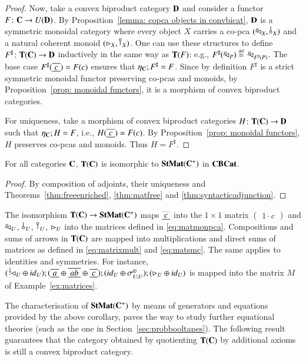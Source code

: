 \begin{proof}
Now, take a convex biproduct category $\mathbf{D}$ and consider a functor $F\colon \mathbf{C} \to U(\mathbf{D})$. By Proposition~\ref{lemma: copca objects in convbicat}, $\mathbf{D}$ is a symmetric monoidal category where every object $X$  carries a  co-pca $(\diagp{X},\bang{X})$ and a natural coherent monoid $(\codiag{X},\cobang{X})$. One can use these structures to define $F^\sharp\colon \mathbf{T}(\mathbf{C}) \to \mathbf{D}$ inductively in the same way as  $\mathbf{T}(F)$: e.g., $F^\sharp(^p\!\! \lhd_{P})\stackrel{\text{\tiny def}}{=} \,^p\!\! \lhd_{F^\sharp(P)}$. The base case $F^\sharp(\tapeFunct{c})=F(c)$ ensures that $\eta_{\mathbf{C}}; F^\sharp = F$.
Since by definition $F^\sharp$ is a strict symmetric monoidal functor preserving co-pcas and monoids, by Proposition~\ref{prop: monoidal functors}, it is a morphism of convex biproduct categories. 

For uniqueness, take a morphism of convex biproduct categories $H \colon \mathbf{T}(\mathbf{C}) \to \mathbf{D}$ such that $\eta_{\mathbf{C}}; H = F$, i.e.,  $H(\tapeFunct{c})=F(c)$. By Proposition~\ref{prop: monoidal functors}, $H$  preserves co-pcas and monoids. Thus $H=F^\sharp$.
\end{proof}

\begin{corollary}\label{cor:isotapematrices}
For all categories $\mathbf{C}$, $\mathbf{T}(\mathbf{C})$ is isomorphic to $\mathbf{StMat}(\mathbf{C}^+)$ in $\mathbf{CBCat}$.
\end{corollary}
\begin{proof}
By composition of adjoints, their uniqueness and Theorems~\ref{thm:freeenriched}, \ref{thm:matfree} and \ref{thm:syntacticadjunction}.
\end{proof}
The isomorphism $\mathbf{T}(\mathbf{C}) \to \mathbf{StMat}(\mathbf{C}^+)$ maps $\tapeFunct{c}$ into the 
$1\times 1$ matrix $\begin{pmatrix}
   1 \cdot c
\end{pmatrix}$ and  $^p\!\! \lhd_{U}$, $\bang{U}$, $\cobang{U}$, $\rhd_{U}$ into the matrices defined in \eqref{eq:matmonpca}.  Compositions and sums of arrows in $\mathbf{T}(\mathbf{C})$ %
are mapped into multiplications and direct sums of matrices as defined in \eqref{eq:matrixmult} and \eqref{eq:matsmc}. The same applies to identities and symmetries. For instance, $(\diagpX{\frac{1}{2}\;\,}{U} \oplus \id{U}) ; (\tapeFunct{a}\oplus \tapeFunct{ab} \oplus \tapeFunct{c}); (\id{U}\oplus \symmp{U}{U}); (\codiag{U}\oplus \id{U})$ is mapped into the matrix $M$ of Example~\ref{ex:matrices}. 

The characterisation of $\mathbf{StMat}(\mathbf{C}^+)$ by means of generators and equations provided by the above corollary, paves the way to study further equational theories (such as the one in Section~\ref{sec:probbooltapes}). The following result guarantees that the category obtained by quotienting $\mathbf{T}(\mathbf{C})$ by additional axioms is still a convex biproduct category.
%


